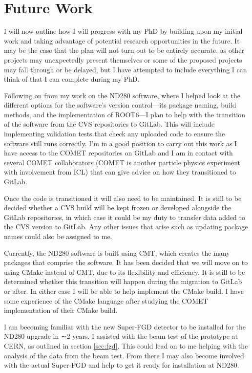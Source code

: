 \documentclass[aps,pra,12pt,notitlepage,tightenlines]{revtex4-1}
\begin{document}
\section{Future Work}
I will now outline how I will progress with my PhD by building upon my initial work and taking advantage of potential research opportunities in the future. It may be the case that the plan will not turn out to be entirely accurate, as other projects may unexpectedly present themselves or some of the proposed projects may fall through or be delayed, but I have attempted to include everything I can think of that I can complete during my PhD.

Following on from my work on the ND280 software, where I helped look at the different options for the software’s version control---its package naming, build methods, and the implementation of ROOT6---I plan to help with the transition of the software from the CVS repositories to GitLab. This will include implementing validation tests that check any uploaded code to ensure the software still runs correctly. I'm in a good position to carry out this work as I have access to the COMET repositories on GitLab and I am in contact with several COMET collaborators (COMET is another particle physics experiment with involvement from ICL) that can give advice on how they transitioned to GitLab.

Once the code is transitioned it will also need to be maintained. It is still to be decided whether a CVS build will be kept frozen or developed alongside the GitLab repositories, in which case it could be my duty to transfer data added to the CVS version to GitLab. Any other issues that arise such as updating package names could also be assigned to me.

Currently, the ND280 software is built using CMT, which creates the many packages that comprise the software. It has been decided that we will move on to using CMake instead of CMT, due to its flexibility and efficiency. It is still to be determined whether this transition will happen during the migration to GitLab or after. In either case I will be able to help implement the CMake build. I have some experience of the CMake language after studying the COMET implementation of their CMake build.

I am becoming familiar with the new Super-FGD detector to be installed for the ND280 upgrade in ∼2 years. I assisted with the beam test of the prototype at CERN, as outlined in section \ref{sec:fgd}. This could lead on to me helping with the analysis of the data from the beam test. From there I may also become involved with the actual Super-FGD and help to get it ready for installation at ND280.
\end{document}
